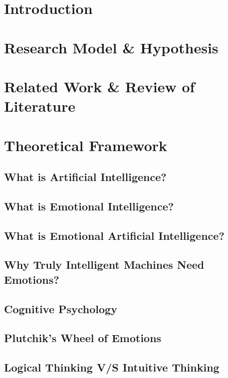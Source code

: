 \documentclass[12pt, a4paper]{article}
\begin{document}
	\begin{multicols}{2}
		\section{Introduction}
		
		\section{Research Model \& Hypothesis}
		
		\section{Related Work \& Review of Literature}
		
		\section{Theoretical Framework}
		\subsection{What is Artificial Intelligence?}
		
		\subsection{What is Emotional Intelligence?}
		
		\subsection{What is Emotional Artificial Intelligence?}
		
		\subsection{Why Truly Intelligent Machines Need Emotions?}
		
		\subsection{Cognitive Psychology}
		
		\subsection{Plutchik's Wheel of Emotions}
		
		\subsection{Logical Thinking V/S Intuitive Thinking}
		

\end{multicols}
\end{document}
